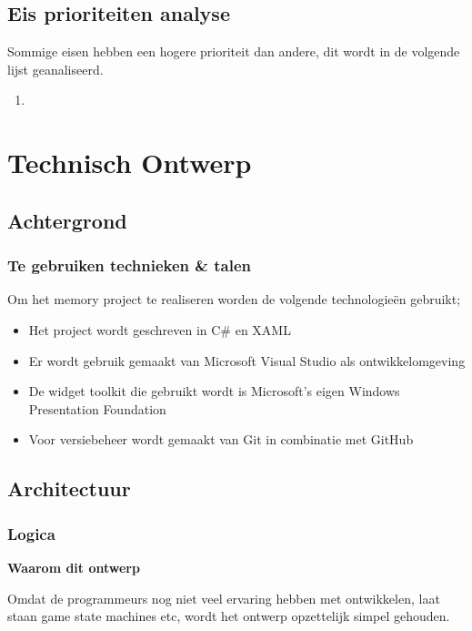\documentclass[a4paper,titlepage,11pt]{article}
\begin{document}
\subsection{Eis prioriteiten analyse}

Sommige eisen hebben een hogere prioriteit dan andere, dit wordt in de volgende lijst
geanaliseerd.

\begin{enumerate}
\item 
\end{enumerate}

\clearpage

\section{Technisch Ontwerp}

\subsection{Achtergrond}

\subsubsection{Te gebruiken technieken \& talen}

Om het memory project te realiseren worden de volgende technologieën gebruikt;
\begin{itemize}
\item Het project wordt geschreven in C\# en XAML
\item Er wordt gebruik gemaakt van Microsoft Visual Studio als ontwikkelomgeving
\item De widget toolkit die gebruikt wordt is Microsoft’s eigen Windows Presentation Foundation
\item Voor versiebeheer wordt gemaakt van Git in combinatie met GitHub
\end{itemize}

\subsection{Architectuur}

\subsubsection{Logica}

{\bf Waarom dit ontwerp}

Omdat de programmeurs nog niet veel ervaring hebben met ontwikkelen, laat staan
game state machines etc, wordt het ontwerp opzettelijk simpel gehouden.
\end{document}
